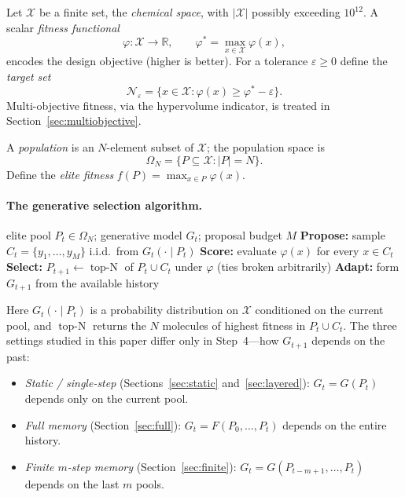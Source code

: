 \documentclass[11pt,a4paper]{article}
\newcommand{\X}{\mathcal{X}}
\newcommand{\Omn}{\Omega_N}
\newcommand{\R}{\mathbb{R}}
\newcommand{\phist}{\varphi^*}
\newcommand{\Neps}{\mathcal{N}_\varepsilon}
\DeclareMathOperator{\topN}{top\text{-}N}
\begin{document}
Let $\X$ be a finite set, the \emph{chemical space}, with $|\X|$
possibly exceeding $10^{12}$.  A scalar \emph{fitness functional}
\[
  \varphi\colon\X\to\R,\qquad
  \phist = \max_{x\in\X}\varphi(x),
\]
encodes the design objective (higher is better).  For a tolerance
$\varepsilon\ge0$ define the \emph{target set}
\[
  \Neps = \{x\in\X : \varphi(x)\ge\phist-\varepsilon\}.
\]
Multi-objective fitness, via the hypervolume indicator, is treated in
Section~\ref{sec:multiobjective}.

A \emph{population} is an $N$-element subset of $\X$; the population
space is
\[
  \Omn = \{P\subseteq\X : |P|=N\}.
\]
Define the \emph{elite fitness} $f(P)=\max_{x\in P}\varphi(x)$.

\paragraph{The generative selection algorithm.}

\begin{algorithm}[ht]
\caption{Generative Selection (one round at time $t$)}\label{alg:gen-sel}
\begin{algorithmic}[1]
\Require elite pool $P_t\in\Omn$; generative model $G_t$; proposal budget $M$
\State \textbf{Propose:} sample $C_t=\{y_1,\dots,y_M\}$ i.i.d.\ from $G_t(\cdot\mid P_t)$
\State \textbf{Score:} evaluate $\varphi(x)$ for every $x\in C_t$
\State \textbf{Select:} $P_{t+1}\leftarrow\topN$ of $P_t\cup C_t$ under $\varphi$ (ties broken arbitrarily)
\State \textbf{Adapt:} form $G_{t+1}$ from the available history
\end{algorithmic}
\end{algorithm}

\medskip
Here $G_t(\cdot\mid P_t)$ is a probability distribution on $\X$
conditioned on the current pool, and $\topN$ returns the $N$ molecules
of highest fitness in $P_t\cup C_t$.  The three settings studied in this
paper differ only in Step~4---how $G_{t+1}$ depends on the past:

\begin{itemize}[nosep]
\item \emph{Static / single-step} (Sections~\ref{sec:static}
  and~\ref{sec:layered}):
  $G_t=G(P_t)$ depends only on the current pool.
\item \emph{Full memory} (Section~\ref{sec:full}):
  $G_t=F(P_0,\dots,P_t)$ depends on the entire history.
\item \emph{Finite $m$-step memory} (Section~\ref{sec:finite}):
  $G_t=G(P_{t-m+1},\dots,P_t)$ depends on the last $m$ pools.
\end{itemize}
\end{document}
